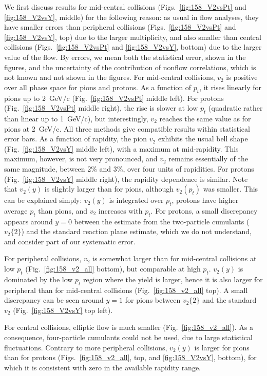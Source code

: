 \documentclass[aps,prc,superscriptaddress,showpacs,floatfix,nofootinbib]{revtex4}
\begin{document}
We first discuss results for mid-central collisions
(Figs.~\ref{fig:158_V2vsPt} and \ref{fig:158_V2vsY}, middle) for
the following reason: as usual in flow analyses, they have smaller
errors than peripheral collisions (Figs.~\ref{fig:158_V2vsPt} and
\ref{fig:158_V2vsY}, top) due to the larger multiplicity, and
also smaller than central collisions (Figs.~\ref{fig:158_V2vsPt} and
\ref{fig:158_V2vsY}, bottom) due to the larger value of the flow.  By
errors, we mean both the statistical error, shown in the figures, and
the uncertainty of the contribution of nonflow correlations,
which is not known and not shown in the figures.  For mid-central
collisions, $v_2$ is positive over all phase space for pions and
protons.  As a function of $p_t$, it rises linearly for pions up to
2~GeV/c (Fig.~\ref{fig:158_V2vsPt} middle left).  For protons
(Fig.~\ref{fig:158_V2vsPt} middle right), the rise is slower at low
$p_t$ (quadratic rather than linear up to 1~GeV/c), but interestingly,
$v_2$ reaches the same value as for pions at 2~GeV/c.  All three
methods give compatible results within statistical error bars.  As a
function of rapidity, the pion $v_2$ exhibits the usual bell shape
(Fig.~\ref{fig:158_V2vsY} middle left), with a maximum at
mid-rapidity. This maximum, however, is not very pronounced, and $v_2$
remains essentially of the same magnitude, between 2\% and 3\%, over
four units of rapidities.  For protons (Fig.~\ref{fig:158_V2vsY}
middle right), the rapidity dependence is similar. Note that $v_2(y)$
is slightly larger than for pions, although $v_2(p_t)$ was
smaller. This can be explained simply: $v_2(y)$ is integrated over
$p_t$, protons have higher average $p_t$ than pions, and $v_2$
increases with $p_t$.  For protons, a small discrepancy appears around
$y=0$ between the estimate from the two-particle cumulants
($v_2\{2\}$) and the standard reaction plane estimate, which we do not
understand, and consider part of our systematic error.

For peripheral collisions, $v_2$ is somewhat larger than for
mid-central collisions at low $p_t$ (Fig.~\ref{fig:158_v2_all}
bottom), but comparable at high $p_t$. $v_2(y)$ is dominated by the
low $p_t$ region where the yield is larger, hence it is also larger
for peripheral than for mid-central collisions
(Fig.~\ref{fig:158_v2_all} top).  A small discrepancy can be seen
around $y=1$ for pions between $v_2\{2\}$ and the standard $v_2$
(Fig.~\ref{fig:158_V2vsY} top left).

For central collisions, elliptic flow is much smaller
(Fig.~\ref{fig:158_v2_all}).  As a consequence, four-particle
cumulants could not be used, due to large statistical fluctuations.
Contrary to more peripheral collisions, $v_2(y)$ is larger for pions
than for protons (Figs.~\ref{fig:158_v2_all}, top, and
\ref{fig:158_V2vsY}, bottom), for which it is consistent with zero in
the available rapidity range.
\end{document}

